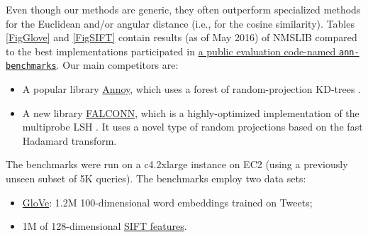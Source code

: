 \documentclass[runningheads,a4paper]{llncs}
\newcommand{\ttt}[1]{\texttt{#1}}
\begin{document}
{Even though our methods are generic, they often outperform specialized methods for the Euclidean and/or angular distance
 (i.e., for the cosine similarity).
Tables \ref{FigGlove} and \ref{FigSIFT}
contain results (as of May 2016) of NMSLIB compared to the best implementations participated in \href{https://github.com/erikbern/ann-benchmarks}{a public evaluation code-named \ttt{ann-benchmarks}}. Our main competitors are: 

\begin{itemize}
\item A popular library \href{https://github.com/spotify/annoy}{Annoy}, which uses a forest of random-projection KD-trees \cite{SilpaAnan2008OptimisedKF}.
\item A new library \href{https://github.com/FALCONN-LIB/FALCONN}{FALCONN}, which is a highly-optimized implementation of the multiprobe LSH \cite{andoni2015practical}. It uses a novel type of random projections based on the fast Hadamard transform.
\end{itemize}

The benchmarks were run on a c4.2xlarge instance on EC2 (using a previously unseen subset of 5K queries). The benchmarks employ two data sets:
\begin{itemize}
\item \href{http://nlp.stanford.edu/projects/glove/}{GloVe}: 1.2M 100-dimensional word embeddings trained on Tweets;
\item 1M of 128-dimensional \href{http://corpus-texmex.irisa.fr/}{SIFT features}.  
\end{itemize}

}
\end{document}
